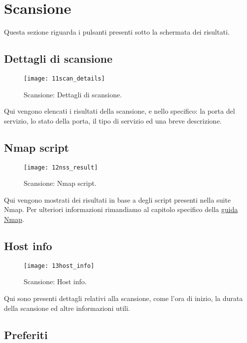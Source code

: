 \section{Scansione}
\label{sec:ContentsScan}

Questa sezione riguarda i pulsanti presenti sotto la schermata dei risultati.

\subsection{Dettagli di scansione}
\label{sec:ContentsScanScanDetails}

\begin{figure}[h]
  \centering
  \texttt{[image: 11scan\_details]}
  \caption{Scansione: Dettagli di scansione.}
  \label{fig:ContentsScanScanDetails}
\end{figure}
Qui vengono elencati i risultati della scansione, e nello specifico: la porta 
del servizio, lo stato della porta, il tipo di servizio ed una breve descrizione.

\subsection{Nmap script}
\label{sec:ContentsScanNmapScript}

\begin{figure}[h]
  \centering
  \texttt{[image: 12nss\_result]}
  \caption{Scansione: Nmap script.}
  \label{fig:ContentsScanNmapScript}
\end{figure}
Qui vengono mostrati dei risultati in base a degli script presenti nella suite 
Nmap. Per ulteriori informazioni rimandiamo al capitolo specifico della 
\href{http://nmap.org/book/nse.html}{guida Nmap}.

\subsection{Host info}
\label{sec:ContentsScanHostInfo}

\begin{figure}[h]
  \centering
  \texttt{[image: 13host\_info]}
  \caption{Scansione: Host info.}
  \label{fig:ContentsScanHostInfo}
\end{figure}
Qui sono presenti dettagli relativi alla scansione, come l'ora di inizio, la 
durata della scansione ed altre informazioni utili.

\subsection{Preferiti}
\label{sec:ContentsScanBookmarks}

